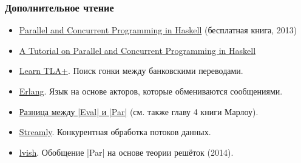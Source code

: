 \documentclass[11pt]{beamer}
\begin{document}
\begin{frame}[fragile]
  \frametitle{Дополнительное чтение}
  \small
  \begin{itemize}
    \setlength{\itemsep}{1pt}
    \item \href{https://simonmar.github.io/pages/pcph.html}{Parallel and Concurrent Programming in Haskell} (бесплатная книга, 2013)
    \item \href{https://www.microsoft.com/en-us/research/wp-content/uploads/2016/02/parallel_haskell2.pdf}{A Tutorial on Parallel and Concurrent Programming in Haskell}
    \item \href{https://learntla.com/intro/conceptual-overview.html}{Learn TLA+}. Поиск гонки между банковскими переводами.
    \item \href{https://erlang.org/}{Erlang}. Язык на основе акторов, которые обмениваются сообщениями.
    \item \href{https://stackoverflow.com/questions/23326920/difference-between-par-monad-and-eval-monad-with-deepseq/23428610#23428610}{Разница между \haskinline|Eval| и \haskinline|Par|} (см. также главу 4 книги Марлоу).
    \item \href{https://hackage.haskell.org/package/streamly}{Streamly}. Конкурентная обработка потоков данных.
    \item \href{https://hackage.haskell.org/package/lvish}{lvish}. Обобщение \haskinline|Par| на основе теории решёток (2014).
  \end{itemize}
\end{frame}
\end{document}
